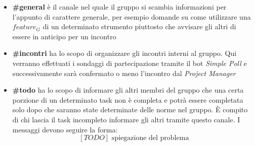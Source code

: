 			\begin{itemize}
				\item \textbf{\#general} è il canale nel quale il gruppo si scambia informazioni per l'appunto di carattere generale, per esempio domande su come utilizzare una $feature_G$ di un determinato strumento piuttosto che avvisare gli altri di essere in anticipo per un incontro
				\item \textbf{\#incontri} ha lo scopo di organizzare gli incontri interni al gruppo. Qui verranno effettuati i sondaggi di partecipazione tramite il bot \emph{Simple Poll} e successivamente sarà confermato o meno l'incontro dal \emph{Project Manager}
				\item \textbf{\#todo} ha lo scopo di informare gli altri membri del gruppo che una certa porzione di un determinato task non è completa e potrà essere completata solo dopo che saranno state determinate delle norme nel gruppo. È compito di chi lascia il task incompleto informare gli altri tramite questo canale. I messaggi devono seguire la forma:
						$$[TODO]\text{ spiegazione del problema}$$
			\end{itemize}
			
